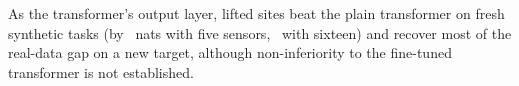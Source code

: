 As the transformer's output layer, lifted sites beat the plain transformer on fresh synthetic tasks (by
\VThreeEFivegainabs\ nats with five sensors, \VThreeESixgainabs\ with sixteen) and recover most of
the real-data gap on a new target, although non-inferiority to the fine-tuned transformer is not established.

